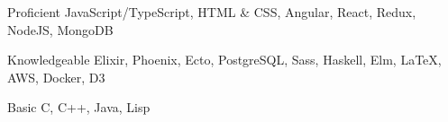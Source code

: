 

\begin{cvskills}

  \cvskill
    {Proficient} %
    {JavaScript/TypeScript, HTML \& CSS, Angular, React, Redux, NodeJS, MongoDB} %

  \cvskill
    {Knowledgeable} %
    {Elixir, Phoenix, Ecto, PostgreSQL, Sass, Haskell, Elm, LaTeX, AWS, Docker, D3} %

  \cvskill
    {Basic} %
    {C, C++, Java, Lisp} %

\end{cvskills}
